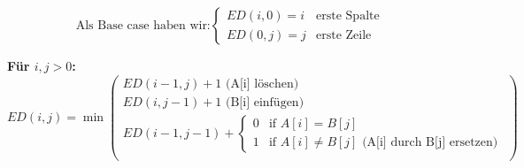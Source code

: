 \documentclass[a4paper]{article}
\begin{document}
\begin{equation*}
    \text{Als Base case haben wir:}
  \begin{cases}
    ED(i, 0) = i & \text{erste Spalte}  \\
    ED(0, j) = j & \text{erste Zeile}
    \end{cases}   
\end{equation*}

\textbf{Für $i, j > 0$: }
\begin{equation*}
    {ED}(i, j) = \min \left( \begin{array}{c}
    {ED}(i-1, j) + 1 \text{ (A[i] löschen)}\\
    {ED}(i, j-1) + 1 \text{ (B[i] einfügen)}\\
    {ED}(i-1, j-1) + \begin{cases}
    0 & \text{if } A[i] = B[j] \\
    1 & \text{if } A[i] \neq B[j] \text{ (A[i] durch B[j] ersetzen)}
    \end{cases} \\
    \end{array} \right)
\end{equation*}
\end{document}
